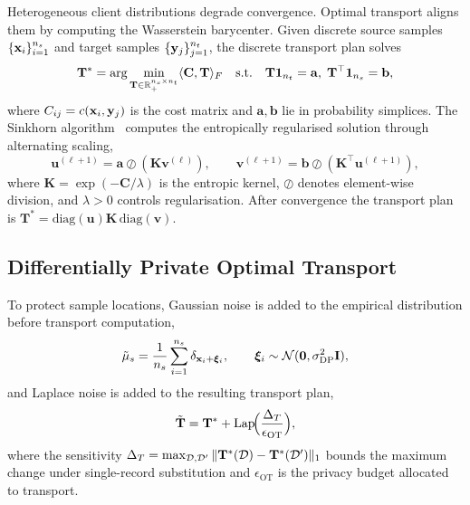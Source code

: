 Heterogeneous client distributions degrade convergence. Optimal transport aligns them by computing the Wasserstein barycenter. Given discrete source samples $\{\mathbf{x}_i\}_{i=1}^{n_s}$ and target samples $\{\mathbf{y}_j\}_{j=1}^{n_t}$, the discrete transport plan solves
\begin{equation}
\mathbf{T}^* = \arg\min_{\mathbf{T}\in\mathbb{R}_+^{n_s\times n_t}}
\langle\mathbf{C},\mathbf{T}\rangle_F
\quad\text{s.t.}\quad
\mathbf{T}\mathbf{1}_{n_t}=\mathbf{a},\;
\mathbf{T}^\top\mathbf{1}_{n_s}=\mathbf{b},
\label{eq:fed_ot}
\end{equation}
where $C_{ij}=c(\mathbf{x}_i,\mathbf{y}_j)$ is the cost matrix and $\mathbf{a},\mathbf{b}$ lie in probability simplices. The Sinkhorn algorithm~\cite{Cuturi2013,Chizat2020,Villani2009} computes the entropically regularised solution through alternating scaling,
\begin{equation}
\mathbf{u}^{(\ell+1)} = \mathbf{a}\oslash(\mathbf{K}\mathbf{v}^{(\ell)}),
\qquad
\mathbf{v}^{(\ell+1)} = \mathbf{b}\oslash(\mathbf{K}^\top\mathbf{u}^{(\ell+1)}),
\label{eq:sinkhorn}
\end{equation}
where $\mathbf{K}=\exp(-\mathbf{C}/\lambda)$ is the entropic kernel, $\oslash$ denotes element-wise division, and $\lambda>0$ controls regularisation. After convergence the transport plan is $\mathbf{T}^*=\mathrm{diag}(\mathbf{u})\mathbf{K}\,\mathrm{diag}(\mathbf{v})$.

\subsection{Differentially Private Optimal Transport}

To protect sample locations, Gaussian noise is added to the empirical distribution before transport computation,\begin{equation}
\tilde{\mu}_s = \frac{1}{n_s}\sum_{i=1}^{n_s}\delta_{\mathbf{x}_i+\bm{\xi}_i},
\qquad \bm{\xi}_i\sim\mathcal{N}(\mathbf{0},\sigma_{\mathrm{DP}}^2\mathbf{I}),
\label{eq:fed_dp_ot_dist}
\end{equation}and Laplace noise is added to the resulting transport plan,\begin{equation}
\tilde{\mathbf{T}} = \mathbf{T}^*
+ \mathrm{Lap}\!\Bigl(\frac{\Delta_T}{\epsilon_{\mathrm{OT}}}\Bigr),
\label{eq:fed_dp_ot_plan}
\end{equation}
where the sensitivity $\Delta_T=\max_{\mathcal{D},\mathcal{D}'}\|\mathbf{T}^*(\mathcal{D})-\mathbf{T}^*(\mathcal{D}')\|_1$ bounds the maximum change under single-record substitution and $\epsilon_{\mathrm{OT}}$ is the privacy budget allocated to transport.

